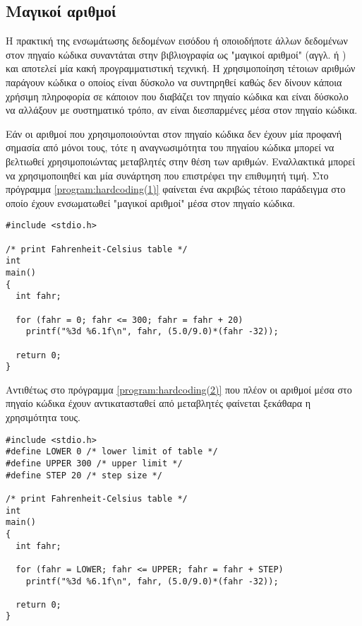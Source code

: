 \subsection[Μαγικοί αριθμοί]{Μαγικοί αριθμοί \cite{wikibook:cpp_style,site:geosoft,kernighan1988c}}

Η πρακτική της ενσωμάτωσης δεδομένων εισόδου ή οποιοδήποτε άλλων δεδομένων στον πηγαίο κώδικα συναντάται στην βιβλιογραφία ως "μαγικοί αριθμοί" (αγγλ.  ή ) και αποτελεί μία κακή προγραμματιστική τεχνική. Η χρησιμοποίηση τέτοιων αριθμών παράγουν κώδικα ο οποίος είναι δύσκολο να συντηρηθεί καθώς δεν δίνουν κάποια χρήσιμη πληροφορία σε κάποιον που διαβάζει τον πηγαίο κώδικα και είναι δύσκολο να αλλάξουν με συστηματικό τρόπο, αν είναι διεσπαρμένες μέσα στον πηγαίο κώδικα.

Εάν οι αριθμοί που χρησιμοποιούνται στον πηγαίο κώδικα δεν έχουν μία προφανή σημασία από μόνοι τους, τότε η αναγνωσιμότητα του πηγαίου κώδικα μπορεί να βελτιωθεί χρησιμοποιώντας μεταβλητές στην θέση των αριθμών. Εναλλακτικά μπορεί να χρησιμοποιηθεί και μία συνάρτηση που επιστρέφει την επιθυμητή τιμή. Στο πρόγραμμα \ref{program:hardcoding(1)} φαίνεται ένα ακριβώς τέτοιο παράδειγμα στο οποίο έχουν ενσωματωθεί "μαγικοί αριθμοί" μέσα στον πηγαίο κώδικα. 

\begin{lstlisting}[style=cpp,caption= Παράδειγμα "Μαγικών αριθμών" (1), label=program:hardcoding(1)]
#include <stdio.h>

/* print Fahrenheit-Celsius table */
int
main()
{
  int fahr;

  for (fahr = 0; fahr <= 300; fahr = fahr + 20)
    printf("%3d %6.1f\n", fahr, (5.0/9.0)*(fahr -32));

  return 0;
}
\end{lstlisting}

Αντιθέτως στο πρόγραμμα \ref{program:hardcoding(2)} που πλέον οι αριθμοί μέσα στο πηγαίο κώδικα έχουν αντικατασταθεί από μεταβλητές φαίνεται ξεκάθαρα η χρησιμότητα τους.

\begin{lstlisting}[style=cpp,caption= Παράδειγμα "Μαγικών αριθμών" (2), label=program:hardcoding(2)]
#include <stdio.h>
#define LOWER 0 /* lower limit of table */
#define UPPER 300 /* upper limit */
#define STEP 20 /* step size */

/* print Fahrenheit-Celsius table */
int
main()
{
  int fahr;

  for (fahr = LOWER; fahr <= UPPER; fahr = fahr + STEP)
    printf("%3d %6.1f\n", fahr, (5.0/9.0)*(fahr -32));

  return 0;
}
\end{lstlisting}

